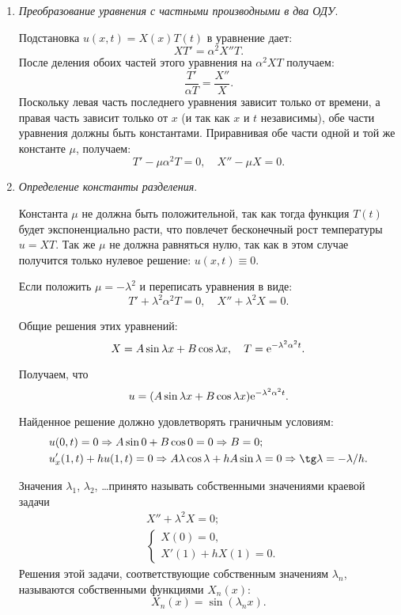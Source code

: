 \begin{enumerate}
    \item \emph{Преобразование уравнения с частными производными в два ОДУ}.
    
    Подстановка \( u(x, t) = X(x)T(t) \) в уравнение дает:
    \[
        XT' = \alpha^2 X''T.
    \]
    После деления обоих частей этого уравнения на \( \alpha^2 XT \) получаем:
    \[
        \frac{T'}{\alpha T} = \frac{X''}{X}.
    \]
    Поскольку левая часть последнего уравнения зависит только от времени, а
    правая часть зависит только от \( x \) (и так как \( x \) и \( t \)
    независимы), обе части уравнения должны быть константами. Приравнивая обе
    части одной и той же константе \( \mu \), получаем:
    \[
        T' - \mu\alpha^2 T = 0, \quad X'' - \mu X = 0.
    \]

    \item \emph{Определение константы разделения}.
    
    Константа \( \mu \) не должна быть положительной, так как тогда функция
    \( T(t) \) будет экспоненциально расти, что повлечет бесконечный рост
    температуры \( u = XT \). Так же \( \mu \) не должна равняться нулю, так как в этом
    случае получится только нулевое решение: \( u(x, t) \equiv 0 \).
    
    Если положить \( \mu = -\lambda^2 \) и переписать уравнения в виде:
    \[
        T' + \lambda^2\alpha^2 T = 0, \quad X'' + \lambda^2 X = 0.
    \]
    
    Общие решения этих уравнений:
    \[
        X = A\sin\lambda x + B\cos\lambda x, \quad T = \mathrm{e}^{-\lambda^2\alpha^2 t}.
    \]

    Получаем, что
    \[
        u = (A\sin\lambda x + B\cos\lambda x)\mathrm{e}^{-\lambda^2\alpha^2 t}.
    \]

    Найденное решение должно удовлетворять граничным условиям:
    \begin{align*}
        & u(0, t) = 0 \Rightarrow A\sin0 + B\cos0 = 0 \Rightarrow B = 0; \\
        & u'_x(1, t) + hu(1, t) = 0 \Rightarrow A\lambda\cos\lambda +
        hA\sin\lambda = 0 \Rightarrow \tg\lambda = -\lambda/h.
    \end{align*}
    
    Значения \( \lambda_1 \), \( \lambda_2 \), \ldots принято называть
    собственными значениями краевой задачи
    \begin{align*}
        & X'' + \lambda^2 X = 0; \\
        & \left\{ \begin{array}{l}
            X(0) = 0, \\
            X'(1) + hX(1) = 0.
        \end{array} \right.
    \end{align*}
    Решения этой задачи, соответствующие собственным значениям \( \lambda_n \),
    называются собственными функциями \( X_n(x) \):
    \[
        X_n(x) = \sin(\lambda_nx).
    \]
    

\end{enumerate}

